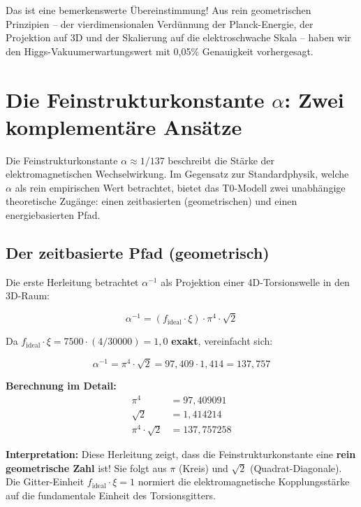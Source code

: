 	Das ist eine bemerkenswerte Übereinstimmung! Aus rein geometrischen Prinzipien -- der vierdimensionalen Verdünnung der Planck-Energie, der Projektion auf 3D und der Skalierung auf die elektroschwache Skala -- haben wir den Higgs-Vakuumerwartungswert mit 0{,}05\% Genauigkeit vorhergesagt.
	
	\section{Die Feinstrukturkonstante \(\alpha\): Zwei komplementäre Ansätze}
	
	Die Feinstrukturkonstante \(\alpha \approx 1/137\) beschreibt die Stärke der elektromagnetischen Wechselwirkung. Im Gegensatz zur Standardphysik, welche \(\alpha\) als rein empirischen Wert betrachtet, bietet das T0-Modell zwei unabhängige theoretische Zugänge: einen zeitbasierten (geometrischen) und einen energiebasierten Pfad.
	
	\subsection{Der zeitbasierte Pfad (geometrisch)}
	
	Die erste Herleitung betrachtet \(\alpha^{-1}\) als Projektion einer 4D-Torsionswelle in den 3D-Raum:
	
	\begin{equation}
		\boxed{\alpha^{-1} = (f_{\text{ideal}} \cdot \xi) \cdot \pi^4 \cdot \sqrt{2}}
	\end{equation}
	
	Da \(f_{\text{ideal}} \cdot \xi = 7500 \cdot (4/30000) = 1{,}0\) \textbf{exakt}, vereinfacht sich:
	
	\begin{equation}
		\alpha^{-1} = \pi^4 \cdot \sqrt{2} = 97{,}409 \cdot 1{,}414 = 137{,}757
	\end{equation}
	
	\textbf{Berechnung im Detail:}
	\begin{align}
		\pi^4 &= 97{,}409091 \\
		\sqrt{2} &= 1{,}414214 \\
		\pi^4 \cdot \sqrt{2} &= 137{,}757258
	\end{align}
	
	\textbf{Interpretation:} Diese Herleitung zeigt, dass die Feinstrukturkonstante eine \textbf{rein geometrische Zahl} ist! Sie folgt aus \(\pi\) (Kreis) und \(\sqrt{2}\) (Quadrat-Diagonale). Die Gitter-Einheit \(f_{\text{ideal}} \cdot \xi = 1\) normiert die elektromagnetische Kopplungsstärke auf die fundamentale Einheit des Torsionsgitters.
	
